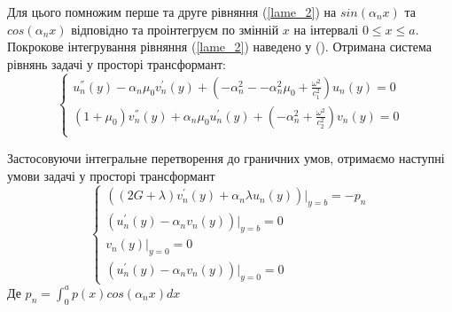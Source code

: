 Для цього помножим перше та друге рівняння (\ref{lame_2}) на $sin(\alpha_n x)$ та $cos(\alpha_n x)$ відповідно та проінтегруєм по змінній $x$ на інтервалі $0 \le x \le a$.
Покрокове інтегрування рівняння (\ref{lame_2}) наведено у ().
Отримана система рівнянь задачі у просторі трансформант:
\begin{equation}\label{transf_2}
    \begin{cases}
        u_n^{''}(y) - \alpha_n \mu_0 v_n^{'}(y) + (-\alpha_n^2 - -\alpha_n^2 \mu_0 + \frac{\omega^2}{c_1^2}) u_n(y) = 0 \\
        (1 + \mu_0) v_n^{''}(y) + \alpha_n \mu_0 u_n^{'}(y) + (- \alpha_n^2 + \frac{\omega^2}{c_2^2}) v_n(y) = 0 \\
    \end{cases}
\end{equation}

Застосовуючи інтегральне перетворення до граничних умов,
отримаємо наступні умови задачі у просторі трансформант
\begin{equation}\label{transf_bound_2}
    \begin{cases}
        \left( (2G + \lambda)v_n^{'}(y) + \alpha_n \lambda u_n(y) \right)|_{y=b} = -p_n \\
        \left(u_n^{'}(y) - \alpha_n v_n(y)  \right)|_{y=b} = 0 \\
        v_n(y)|_{y=0} = 0 \\
        \left(u_n^{'}(y) - \alpha_n v_n(y)  \right)|_{y=0} = 0
    \end{cases}
\end{equation}
Де $p_n = \int_{0}^{a} p(x) cos(\alpha_n x) dx$

